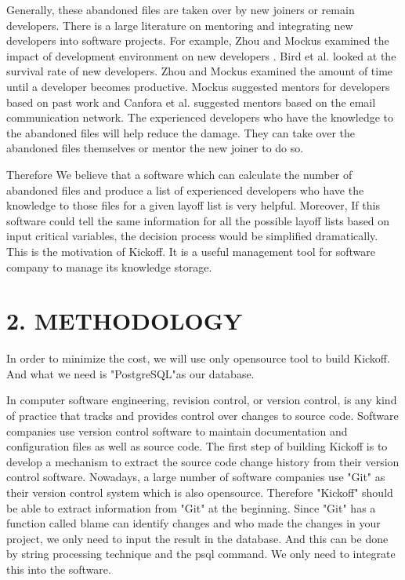 \documentclass[12pt, a4paper, openright]{report}
\begin{document}
Generally, these abandoned files are taken over by new joiners or remain developers. There is a large literature on mentoring and integrating new developers into software projects. For example, Zhou and Mockus examined the impact of development environment on new developers\cite{Zhou2011ICSE} . Bird et al. \cite{Bird2007MSR} looked at the survival rate of new developers. Zhou and Mockus examined the amount of time until a developer becomes productive. Mockus \cite{Mockus2010FSE} suggested mentors for developers based on past work and Canfora et al. \cite{Canfora2012FSE} suggested mentors based on the email communication network. The experienced developers who have the knowledge to the abandoned files will help reduce the damage. They can take over the abandoned files themselves or mentor the new joiner to do so.


Therefore We believe that a software which can calculate the number of abandoned files and produce a list of experienced  developers who have the knowledge to those files for a given layoff list is very helpful. Moreover, If this software could tell the same information for all the possible 
layoff lists based on input critical variables, the decision process would be simplified dramatically. This is the motivation of Kickoff. It is a useful management tool for software company to manage its knowledge storage.



\newpage
\section*{2. METHODOLOGY}

In order to minimize the cost, we will use only opensource tool to build Kickoff. And what we need is "PostgreSQL"as our database.

In computer software engineering, revision control, or version control, is any kind of practice that tracks and provides control over changes to source code. Software companies use version control software to maintain documentation and configuration files as well as source code.
The first step of building Kickoff is to develop a mechanism to extract the source code change history from their version control software. Nowadays, a large number of software companies use "Git" as their version control system which is also opensource. Therefore "Kickoff" should be able to extract information from "Git" at the beginning. Since "Git" has a function called blame can identify changes and who made the changes in your project, we only need to input the result in the database. And this can be done by string processing technique and the psql command. We only need to integrate this into the software.    
\end{document}
